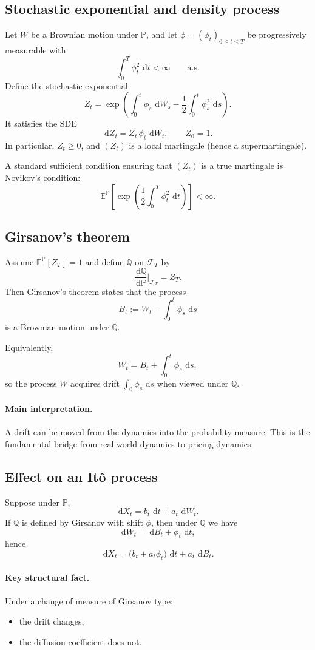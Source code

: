 \documentclass[11pt]{article}
\newcommand{\F}{\mathcal{F}}
\newcommand{\Pbb}{\mathbb{P}}
\newcommand{\Qbb}{\mathbb{Q}}
\newcommand{\E}{\mathbb{E}}
\newcommand{\dd}{\,\mathrm{d}}
\newcommand{\1}{\mathbf{1}}
\theoremstyle{plain}
\theoremstyle{definition}
\theoremstyle{remark}
\begin{document}
\subsection{Stochastic exponential and density process}

Let $W$ be a Brownian motion under $\Pbb$, and let $\phi=(\phi_t)_{0\le t\le T}$ be progressively measurable with
\[
\int_0^T \phi_t^2\,\dd t<\infty
\qquad\text{a.s.}
\]
Define the stochastic exponential
\[
Z_t
=
\exp\!\left(
\int_0^t \phi_s\,\dd W_s
-
\frac12\int_0^t \phi_s^2\,\dd s
\right).
\]
It satisfies the SDE
\[
\dd Z_t = Z_t\,\phi_t\,\dd W_t,
\qquad Z_0=1.
\]
In particular, $Z_t\ge 0$, and $(Z_t)$ is a local martingale (hence a supermartingale).

A standard sufficient condition ensuring that $(Z_t)$ is a true martingale is Novikov's condition:
\[
\E^{\Pbb}\!\left[\exp\!\left(\frac12\int_0^T \phi_t^2\,\dd t\right)\right]<\infty.
\]

\subsection{Girsanov's theorem}

Assume $\E^{\Pbb}[Z_T]=1$ and define $\Qbb$ on $\F_T$ by
\[
\frac{\dd \Qbb}{\dd \Pbb}\Big|_{\F_T}=Z_T.
\]
Then Girsanov's theorem states that the process
\[
B_t:=W_t-\int_0^t \phi_s\,\dd s
\]
is a Brownian motion under $\Qbb$.

Equivalently,
\[
W_t=B_t+\int_0^t \phi_s\,\dd s,
\]
so the process $W$ acquires drift $\int_0^\cdot \phi_s\,\dd s$ when viewed under $\Qbb$.

\paragraph{Main interpretation.}
A drift can be moved from the dynamics into the probability measure.
This is the fundamental bridge from real-world dynamics to pricing dynamics.

\subsection{Effect on an It\^o process}

Suppose under $\Pbb$,
\[
\dd X_t=b_t\,\dd t+a_t\,\dd W_t.
\]
If $\Qbb$ is defined by Girsanov with shift $\phi$, then under $\Qbb$ we have
\[
\dd W_t=\dd B_t+\phi_t\,\dd t,
\]
hence
\[
\dd X_t
=
\big(b_t+a_t\phi_t\big)\,\dd t + a_t\,\dd B_t.
\]

\paragraph{Key structural fact.}
Under a change of measure of Girsanov type:
\begin{itemize}[leftmargin=1.4em]
    \item the drift changes,
    \item the diffusion coefficient does not.
\end{itemize}
\end{document}
